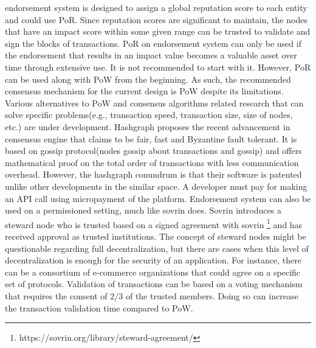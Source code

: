 endorsement system is designed to assign a global reputation score to each
entity and could use PoR. Since reputation scores are significant to maintain,
the nodes that have an impact score within some given range can be trusted to
validate and sign the blocks of transactions. PoR on endorsement system can
only be used if the endorsement that results in an impact value becomes a
valuable asset over time through extensive use. It is not recommended to start
with it. However, PoR can be used along with PoW from the beginning. As such,
the recommended consensus mechanism for the current design is PoW despite its
limitations. Various alternatives to PoW and consensus algorithms related
research that can solve specific problems(e.g., transaction speed, transaction
size, size of nodes, etc.) are under development. 
Hashgraph \cite{baird2016hashgraph}  proposes the recent advancement in
consensus engine that claims to be fair, fast and Byzantine fault tolerant. It
is based on gossip protocol(nodes gossip about transactions and gossip) and
offers mathematical proof on the total order of transactions with less
communication overhead. However, the hashgraph conundrum is that their software
is patented unlike other developments in the similar space. A developer must
pay for making an API call using micropayment of the platform.  Endorsement
system can also be used on a permissioned setting, much like sovrin
\cite{tobin2016inevitable} does.  Sovrin introduces a steward node who is
trusted based on a signed agreement with sovrin
\footnote{https://sovrin.org/library/steward-agreement/} and has received
approval as trusted institutions. The concept of steward nodes might be
questionable regarding full decentralization, but there are cases when this
level of decentralization is enough for the security of an application.   For
instance, there can be a consortium of e-commerce organizations that could
agree on a specific set of protocols. Validation of transactions can be based
on a voting mechanism that requires the consent of 2/3 of the trusted members.
Doing so can increase the transaction validation time compared to PoW.   


